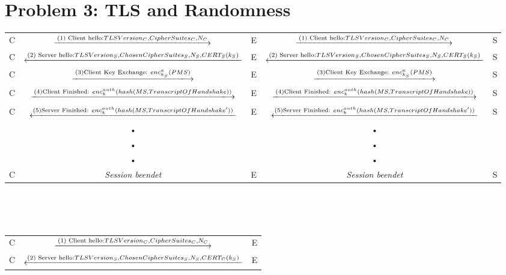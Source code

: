 \documentclass[12pt,pdftex,a4paper]{article}
\begin{document}
\begin{sidewaystable}[ph!]

\section*{Problem 3: TLS and Randomness}
	\begin{tabular}{|c|c|c|c|c|}
		C &  $\xlongrightarrow{\text{(1) Client hello:} TLSVersion_{C},  CipherSuites_{C}, N_{C}}$  & E &  $\xlongrightarrow{\text{(1) Client hello:} TLSVersion_{C},  CipherSuites_{C}, N_{C}}$   & S \\ 
		
		C &  $\xlongleftarrow{\text{(2) Server hello:} TLSVersion_{S},  ChosenCipherSuites_{S}, N_{S}, CERT_{S}(k_{S})}$ & E &  $\xlongleftarrow{\text{(2) Server hello:} TLSVersion_{S},  ChosenCipherSuites_{S}, N_{S}, CERT_{S}(k_{S})}$ & S \\ 
		
		C &  $\xlongrightarrow{\text{(3)Client Key Exchange: } enc^{a}_{k_{S}}(PMS)}$  & E &  $\xlongrightarrow{\text{(3)Client Key Exchange: } enc^{a}_{k_{S}}(PMS)}$  & S \\ 
		
		C &  $\xlongrightarrow{\text{(4)Client Finished: } enc_{k}^{auth}(hash(MS, TranscriptOfHandshake))}$  & E &  $\xlongrightarrow{\text{(4)Client Finished: } enc_{k}^{auth}(hash(MS, TranscriptOfHandshake))}$  & S \\ 
		
		C &  $\xlongleftarrow{\text{(5)Server Finished: } enc_{k}^{auth}(hash(MS, TranscriptOfHandshake'))}$ & E &  $\xlongleftarrow{\text{(5)Server Finished: } enc_{k}^{auth}(hash(MS, TranscriptOfHandshake'))}$ & S \\ 
		& • &  & • &  \\ 
		& • &  & • &  \\ 
		& • &  & • &  \\ 
		C & \textit{Session beendet} & E & \textit{Session beendet} & S \\ 
	\end{tabular} 
	\\\\
	\\
	\begin{tabular}{|c|c|c|}
		C &  $\xlongrightarrow{\text{(1) Client hello:} TLSVersion_{C},  CipherSuites_{C}, N_{C}}$  & E \\ 
		
		C &  $\xlongleftarrow{\text{(2) Server hello:} TLSVersion_{S},  ChosenCipherSuites_{S}, N_{S}, CERT_{C}(k_{S})}$ & E  \\ 
		

\end{tabular}
\end{sidewaystable}
\end{document}

